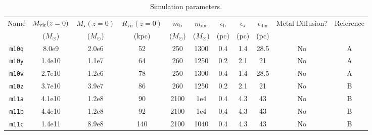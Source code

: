 \documentclass[fleqn,usenatbib]{mnras}
\begin{document}
\begin{table}
\caption{Simulation parameters.}
\begin{tabular}{ccccccccccc}
\hline
Name   & $M_{\rm vir}(z=0)$     & $M_\star(z=0)$     & $R_{\textrm{vir}}(z=0)$   &  $m_\textrm{b}$           & $m_\textrm{dm}$              & $\epsilon_{\textrm{b}}$          & $\epsilon_\star$           & $\epsilon_{\textrm{dm}}$           &    Metal Diffusion?   & Reference        \\
               & ($M_\odot$)                   & ($M_\odot$)                 & (kpc)                  & ($M_\odot$)       & ($M_\odot$)           &  (pc)      & (pc)         &  (pc)          &                                      &                            \\
 \hline
\texttt{m10q}    & 8.0e9                 & 2.0e6                   &  52                        &  250           &  1300         & 0.4          & 1.4           &      28.5   &               No                       &     A              \\  
\texttt{m10y}    & 1.4e10               & 1.1e7                   &  64                        &  260           &  1250         & 0.2          & 2.1           &      21      &                No                      &   A              \\ 
\texttt{m10v}    & 2.7e10                  & 1.2e6                  &  78                         &  250           &  1300         & 0.4          & 1.4           &      28.5   &              No                        &     A             \\  
\texttt{m10z}    & 3.7e10               & 3.9e7                   &  86                        &  260           &  1250         & 0.2          & 2.1           &      21      &                No                     &    B               \\ 
\texttt{m11a}    &  4.1e10              & 1.2e8                   &  90                        &  2100           &  1e4         & 0.4          & 4.3           &      43      &                No                     &     B               \\ 
\texttt{m11b}    &  4.4e10              & 1.2e8                   &  92                        &  2100           &  1e4         & 0.4          & 4.3           &      43      &                No                     &     B              \\ 
\texttt{m11c}    & 1.4e11               & 8.9e8                   &  140                        &  2100           &  1040         & 0.4          & 4.3          &      43      &                No                     &    B               \\ 

\end{tabular}
\end{table}
\end{document}
